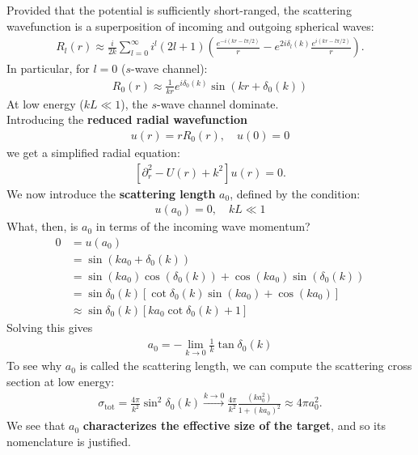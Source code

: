 \documentclass{book}
\theoremstyle{definition}
\newcommand{\p}{\partial}
\newcommand{\f}[2]{\frac{#1}{#2}}
\newcommand{\lp}{\left(}
\newcommand{\rp}{\right)}
\newcommand{\lb}{\left[}
\newcommand{\rb}{\right]}
\begin{document}
Provided that the potential is sufficiently short-ranged, the scattering wavefunction is a superposition of incoming and outgoing spherical waves:
\begin{align*}
	R_l(r) \approx \f{i}{2k} \sum_{l=0}^\infty i^l (2l+1) \lp \f{e^{-i(kr - l\pi/2)}}{r} - e^{2i\delta_l(k)} \f{e^{i(kr - l\pi/2)}}{r} \rp.
\end{align*}
In particular, for $l=0$ ($s$-wave channel):
\begin{align*}
	\boxed{R_0(r) \approx \f{1}{kr} e^{i\delta_0 (k)} \sin(kr + \delta_0(k))}
\end{align*}
At low energy ($kL \ll 1$), the $s$-wave channel dominate. \\

Introducing the \textbf{reduced radial wavefunction} 
\begin{align*}
	u(r) = rR_0(r), \quad u(0) = 0
\end{align*}
we get a simplified radial equation:
\begin{align*}
	\lb \p_r^2 - U(r) + k^2 \rb u(r) = 0.
\end{align*}
We now introduce the \textbf{scattering length} $a_0$, defined by the condition:
\begin{align*}
	u(a_0) = 0, \quad kL\ll 1
\end{align*}
What, then, is $a_0$ in terms of the incoming wave momentum?
\begin{align*}
	0 &= u(a_0)\\
	 &= \sin(ka_0 + \delta_0(k))\\
	 &= \sin(ka_0)\cos(\delta_0(k)) + \cos(ka_0)\sin(\delta_0(k)) \\
	 &= \sin\delta_0(k) \lb \cot \delta_0(k) \sin(ka_0) + \cos(ka_0) \rb\\
	 &\approx \sin \delta_0(k) \lb ka_0 \cot \delta_0(k) + 1 \rb
\end{align*}
Solving this gives
\begin{align*}
	\boxed{a_0 = -\lim_{k\to 0} \f{1}{k}\tan \delta_0(k)}
\end{align*}
To see why $a_0$ is called the scattering length, we can compute the scattering cross section at low energy:
\begin{align*}
	\sigma_\text{tot} =  \f{4\pi}{k^2}\sin^2 \delta_0(k) \xrightarrow{k\to 0} \f{4\pi}{k^2} \f{(ka_0^2)}{1+(ka_0)^2} \approx 4\pi a_0^2.
\end{align*}
We see that $a_0$ \textbf{characterizes the effective size of the target}, and so its nomenclature is justified.\\
\end{document}
